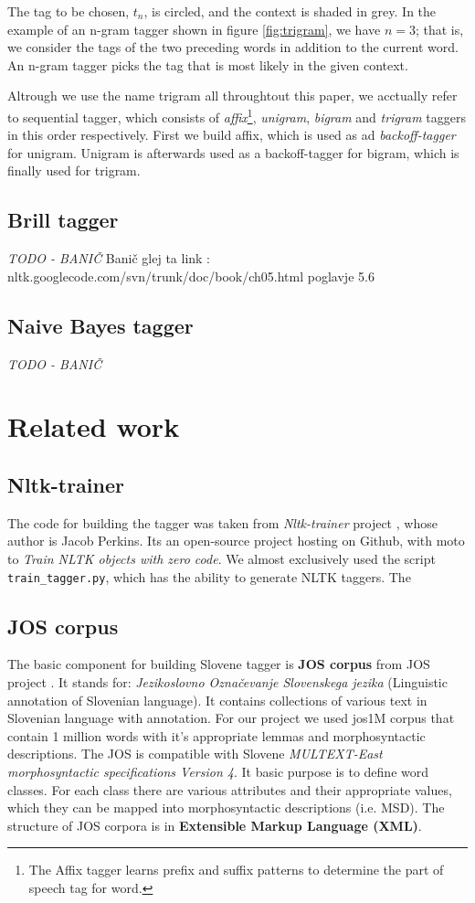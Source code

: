 \documentclass[11pt, conference, compsocconf]{IEEEtran}
\begin{document}
The tag to be chosen, $t_{n}$, is circled, and the context is shaded in grey.
In the example of an n-gram tagger shown in figure \ref{fig:trigram}, we have $n=3$; that is, we consider the tags of the two preceding words in addition to the current word.
An n-gram tagger picks the tag that is most likely in the given context.
\par
Altrough we use the name trigram all throughtout this paper, we acctually refer to sequential tagger, which consists of
\textit{affix}\footnote{The Affix tagger learns prefix and suffix patterns to determine the part of speech tag for word.}, \textit{unigram}, \textit{bigram} and \textit{trigram} taggers in this order respectively. First we build affix, which is used as ad \textit{backoff-tagger} for unigram. Unigram is afterwards used as a backoff-tagger for bigram, which is finally used for trigram.

\subsection{Brill tagger} %
\textit{TODO - BANIČ}
Banič glej ta link : nltk.googlecode.com/svn/trunk/doc/book/ch05.html
poglavje 5.6
\subsection{Naive Bayes tagger} %
\textit{TODO - BANIČ}

\section{Related work}
\subsection{Nltk-trainer} %
The code for building the tagger was taken from \textit{Nltk-trainer}  project \cite{nltk-trainer}, whose author is Jacob Perkins.
Its an open-source project hosting on Github, with moto to \textit{Train NLTK objects with zero code}.
We almost exclusively used the script \texttt{train\_tagger.py}, which has the ability to generate NLTK taggers. The 

\subsection{JOS corpus} %
The basic component for building Slovene tagger is \textbf{JOS corpus} from JOS project \cite{JOS}. It stands for: \textit{Jezikoslovno Označevanje Slovenskega jezika} (Linguistic annotation of Slovenian language).
It contains collections of various text in Slovenian language with annotation.
For our project we used jos1M corpus that contain 1 million words with it's appropriate lemmas and morphosyntactic descriptions.
The JOS is compatible with Slovene\textit{ MULTEXT-East morphosyntactic specifications Version 4}\cite{MULTEXT-East}.
It basic purpose is to define word classes.
For each class there are various attributes and their appropriate values, which they can be mapped into morphosyntactic descriptions (i.e. MSD).
The structure of JOS corpora is in  \textbf{Extensible Markup Language (XML)}.
\end{document}
